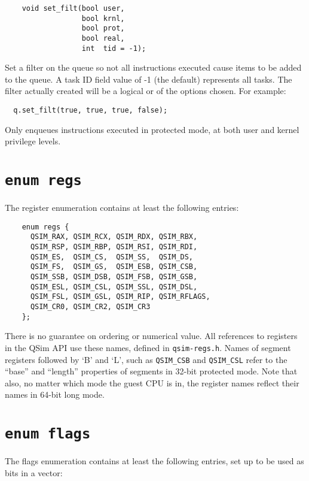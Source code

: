 \documentclass[letterpaper, 10pt]{book}
\begin{document}
\label{func:set_filt} \begin{verbatim}
    void set_filt(bool user, 
                  bool krnl, 
                  bool prot, 
                  bool real,
                  int  tid = -1);
\end{verbatim}

Set a filter on the queue so not all instructions executed cause items to be
added to the queue. A task ID field value of -1 (the default) represents all
tasks. The filter actually created will be a logical or of the options chosen. 
For example:

\begin{verbatim}
  q.set_filt(true, true, true, false);
\end{verbatim}

Only enqueues instructions executed in protected mode, at both user and kernel
privilege levels.
\newpage

\section{\texttt{enum regs}} \label{enum:regs}
The register enumeration contains at least the following entries:

\begin{verbatim}
    enum regs {
      QSIM_RAX, QSIM_RCX, QSIM_RDX, QSIM_RBX,
      QSIM_RSP, QSIM_RBP, QSIM_RSI, QSIM_RDI,
      QSIM_ES,  QSIM_CS,  QSIM_SS,  QSIM_DS,
      QSIM_FS,  QSIM_GS,  QSIM_ESB, QSIM_CSB,
      QSIM_SSB, QSIM_DSB, QSIM_FSB, QSIM_GSB,
      QSIM_ESL, QSIM_CSL, QSIM_SSL, QSIM_DSL,
      QSIM_FSL, QSIM_GSL, QSIM_RIP, QSIM_RFLAGS,
      QSIM_CR0, QSIM_CR2, QSIM_CR3
    };
\end{verbatim}

There is no guarantee on ordering or numerical value. All references to
registers in the QSim API use these names, defined in \texttt{qsim-regs.h}.
Names of segment registers followed by `B' and `L', such as \texttt{QSIM\_CSB}
and \texttt{QSIM\_CSL} refer to the ``base'' and ``length'' properties of
segments in 32-bit protected mode. Note that also, no matter which mode the 
guest CPU is in, the register names reflect their names in 64-bit long mode.
\newpage

\section{\texttt{enum flags}} \label{enum:flags}
The flags enumeration contains at least the following entries, set up to be
used as bits in a vector:
\end{document}
